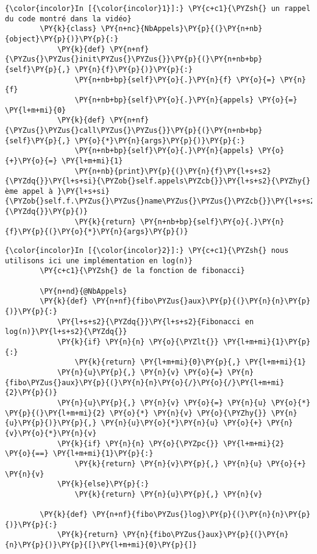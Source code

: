     \begin{Verbatim}[commandchars=\\\{\}]
{\color{incolor}In [{\color{incolor}1}]:} \PY{c+c1}{\PYZsh{} un rappel du code montré dans la vidéo}
        \PY{k}{class} \PY{n+nc}{NbAppels}\PY{p}{(}\PY{n+nb}{object}\PY{p}{)}\PY{p}{:}
            \PY{k}{def} \PY{n+nf}{\PYZus{}\PYZus{}init\PYZus{}\PYZus{}}\PY{p}{(}\PY{n+nb+bp}{self}\PY{p}{,} \PY{n}{f}\PY{p}{)}\PY{p}{:}
                \PY{n+nb+bp}{self}\PY{o}{.}\PY{n}{f} \PY{o}{=} \PY{n}{f}
                \PY{n+nb+bp}{self}\PY{o}{.}\PY{n}{appels} \PY{o}{=} \PY{l+m+mi}{0}
            \PY{k}{def} \PY{n+nf}{\PYZus{}\PYZus{}call\PYZus{}\PYZus{}}\PY{p}{(}\PY{n+nb+bp}{self}\PY{p}{,} \PY{o}{*}\PY{n}{args}\PY{p}{)}\PY{p}{:}
                \PY{n+nb+bp}{self}\PY{o}{.}\PY{n}{appels} \PY{o}{+}\PY{o}{=} \PY{l+m+mi}{1}
                \PY{n+nb}{print}\PY{p}{(}\PY{n}{f}\PY{l+s+s2}{\PYZdq{}}\PY{l+s+si}{\PYZob{}self.appels\PYZcb{}}\PY{l+s+s2}{\PYZhy{}ème appel à }\PY{l+s+si}{\PYZob{}self.f.\PYZus{}\PYZus{}name\PYZus{}\PYZus{}\PYZcb{}}\PY{l+s+s2}{\PYZdq{}}\PY{p}{)}
                \PY{k}{return} \PY{n+nb+bp}{self}\PY{o}{.}\PY{n}{f}\PY{p}{(}\PY{o}{*}\PY{n}{args}\PY{p}{)}
\end{Verbatim}


    \begin{Verbatim}[commandchars=\\\{\}]
{\color{incolor}In [{\color{incolor}2}]:} \PY{c+c1}{\PYZsh{} nous utilisons ici une implémentation en log(n)}
        \PY{c+c1}{\PYZsh{} de la fonction de fibonacci}
        
        \PY{n+nd}{@NbAppels}
        \PY{k}{def} \PY{n+nf}{fibo\PYZus{}aux}\PY{p}{(}\PY{n}{n}\PY{p}{)}\PY{p}{:}
            \PY{l+s+s2}{\PYZdq{}}\PY{l+s+s2}{Fibonacci en log(n)}\PY{l+s+s2}{\PYZdq{}}
            \PY{k}{if} \PY{n}{n} \PY{o}{\PYZlt{}} \PY{l+m+mi}{1}\PY{p}{:}
                \PY{k}{return} \PY{l+m+mi}{0}\PY{p}{,} \PY{l+m+mi}{1}
            \PY{n}{u}\PY{p}{,} \PY{n}{v} \PY{o}{=} \PY{n}{fibo\PYZus{}aux}\PY{p}{(}\PY{n}{n}\PY{o}{/}\PY{o}{/}\PY{l+m+mi}{2}\PY{p}{)}
            \PY{n}{u}\PY{p}{,} \PY{n}{v} \PY{o}{=} \PY{n}{u} \PY{o}{*} \PY{p}{(}\PY{l+m+mi}{2} \PY{o}{*} \PY{n}{v} \PY{o}{\PYZhy{}} \PY{n}{u}\PY{p}{)}\PY{p}{,} \PY{n}{u}\PY{o}{*}\PY{n}{u} \PY{o}{+} \PY{n}{v}\PY{o}{*}\PY{n}{v}
            \PY{k}{if} \PY{n}{n} \PY{o}{\PYZpc{}} \PY{l+m+mi}{2} \PY{o}{==} \PY{l+m+mi}{1}\PY{p}{:}
                \PY{k}{return} \PY{n}{v}\PY{p}{,} \PY{n}{u} \PY{o}{+} \PY{n}{v}
            \PY{k}{else}\PY{p}{:}
                \PY{k}{return} \PY{n}{u}\PY{p}{,} \PY{n}{v}
        
        \PY{k}{def} \PY{n+nf}{fibo\PYZus{}log}\PY{p}{(}\PY{n}{n}\PY{p}{)}\PY{p}{:}
            \PY{k}{return} \PY{n}{fibo\PYZus{}aux}\PY{p}{(}\PY{n}{n}\PY{p}{)}\PY{p}{[}\PY{l+m+mi}{0}\PY{p}{]}
\end{Verbatim}


